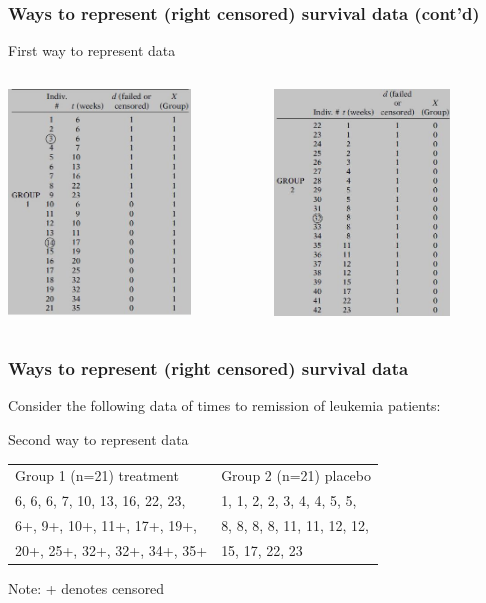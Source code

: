 \documentclass{beamer}
\theoremstyle{definition}
\begin{document}
\begin{frame}
\frametitle{Ways to represent (right censored) survival data (cont'd)}
\begin{block}{First way to represent data }
\begin{columns}
    \begin{column}{0.48\textwidth}
        \includegraphics[width =\textwidth, height=6cm]{Ch1-leuk_dat_a.JPG}
    \end{column}
    \hspace{-10pt}
    \begin{column}{0.48\textwidth}
         \includegraphics[width =\textwidth, height=6cm]{Ch1-leuk_dat_b.JPG}
    \end{column}
\end{columns}
\end{block}
\end{frame}

\begin{frame}
\frametitle{Ways to represent (right censored) survival data}
Consider the following data of times to remission of leukemia patients:
\begin{block}{Second way to represent data }
\begin{table}
\begin{center}
\begin{tabular}{l l}
Group 1 (n=21) treatment & Group 2 (n=21) placebo \\
 6, 6, 6, 7, 10, 13, 16, 22, 23, & 1, 1, 2, 2, 3, 4, 4, 5, 5,  \\
 6+, 9+, 10+, 11+, 17+, 19+, & 8, 8, 8, 8, 11, 11, 12, 12, \\
   20+, 25+, 32+, 32+, 34+, 35+ & 15, 17, 22, 23
\end{tabular}
\end{center}
\end{table}
Note: + denotes censored
\end{block}
\end{frame}
\end{document}
